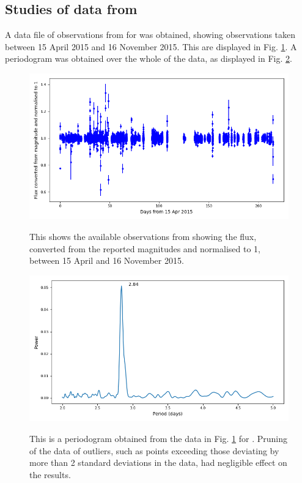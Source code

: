 \subsection{Studies of data from {\MEarth}}
\protect\label{section:mearth}

A data file of observations from {\MEarth} for {\ross} was obtained, showing
observations taken between 15 April 2015 and 16 November 2015. This are
displayed in Fig. \ref{fig:mearthobs}. A periodogram was obtained over the whole
of the data, as displayed in Fig. \ref{fig:mearthallpgram}.

\begin{figure}[!htbp]
\begin{center}
\includegraphics[scale=0.40]{mearth/images/mearthlcurve.png} \\
\vspace{-.5cm}
\end{center}   
\caption{This shows the available observations from
{\MEarth} showing the flux, converted from the reported magnitudes and
normalised to 1, between 15 April and 16 November 2015.}\protect\label{fig:mearthobs}
\end{figure}

\begin{figure}[!htbp]
\begin{center}
\includegraphics[scale=0.40]{mearth/images/mearthallpgram.png} \\
\vspace{-.5cm}
\end{center}   
\caption{This is a periodogram obtained from
the data in Fig. \ref{fig:mearthobs} for \MEarth. Pruning
of the data of outliers, such as points
exceeding those deviating by more than 2
standard deviations in the data, had
negligible effect on the results.}\protect\label{fig:mearthallpgram}
\end{figure}

